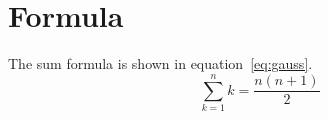 \documentclass{article}
\begin{document}
\section{Formula}
The sum formula is shown in equation~\eqref{eq:gauss}.
\begin{equation}\label{eq:gauss}
  \sum_{k=1}^{n} k = \frac{n(n+1)}{2}
\end{equation}
\end{document}
